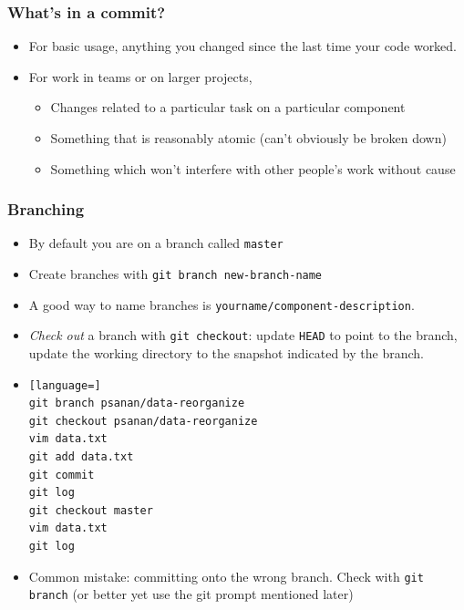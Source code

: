 \begin{frame}[fragile]
\frametitle{What's in a commit?}
\begin{itemize}
\item For basic usage, anything you changed since the last time your code worked.
\item For work in teams or on larger projects,
\begin{itemize}
\item Changes related to a particular task on a particular component
\item Something that is reasonably atomic (can't obviously be broken down)
\item Something which won't interfere with other people's work without cause
\end{itemize}
\end{itemize}
\end{frame}

\begin{frame}[fragile]
\frametitle{Branching}
\begin{itemize}
\item By default you are on a branch called \texttt{master}
\item Create branches with \lstinline{git branch new-branch-name}
\item A good way to name branches is \lstinline{yourname/component-description}.
\item \emph{Check out} a branch with \lstinline{git checkout}: update \texttt{HEAD} to point to the branch, update the working directory to the snapshot indicated by the branch.
\item
\begin{lstlisting}[language=]
git branch psanan/data-reorganize
git checkout psanan/data-reorganize
vim data.txt
git add data.txt
git commit
git log
git checkout master
vim data.txt
git log
\end{lstlisting}
\item Common mistake: committing onto the wrong branch. Check with \lstinline{git branch} (or better yet use the git prompt mentioned later)
\end{itemize}
\end{frame}

